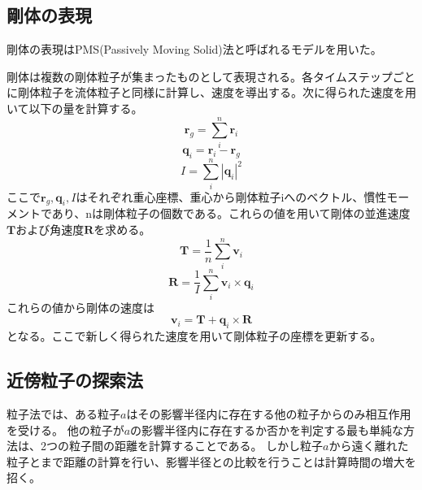 \documentclass[]{jsarticle}
\begin{document}
\subsection{剛体の表現}
剛体の表現はPMS(Passively Moving Solid)法\cite{Gotoh2018}と呼ばれるモデルを用いた。

剛体は複数の剛体粒子が集まったものとして表現される。各タイムステップごとに剛体粒子を流体粒子と同様に計算し、速度を導出する。次に得られた速度を用いて以下の量を計算する。
\begin{equation}
  \bm{r}_g=\sum_{i}^n{\bm{r}_i}
\end{equation}
\begin{equation}
  \bm{q}_i=\bm{r}_i-\bm{r}_g
\end{equation}
\begin{equation}
  I=\sum_{i}^n{|\bm{q}_i|^2}
\end{equation}
ここで$\bm{r}_g,\bm{q}_i,I$はそれぞれ重心座標、重心から剛体粒子iへのベクトル、慣性モーメントであり、nは剛体粒子の個数である。これらの値を用いて剛体の並進速度$\bm{T}$および角速度$\bm{R}$を求める。
\begin{equation}
  \bm{T}=\frac{1}{n}\sum_{i}^n{\bm{v}_i}
\end{equation}
\begin{equation}
  \bm{R}=\frac{1}{I}\sum_{i}^n{\bm{v}_i\times\bm{q}_i}
\end{equation}
これらの値から剛体の速度は
\begin{equation}
\bm{v}_i=\bm{T}+\bm{q}_i\times\bm{R}
\end{equation}
となる。ここで新しく得られた速度を用いて剛体粒子の座標を更新する。

\subsection{近傍粒子の探索法}

粒子法では、ある粒子$a$はその影響半径内に存在する他の粒子からのみ相互作用を受ける。
他の粒子が$a$の影響半径内に存在するか否かを判定する最も単純な方法は、2つの粒子間の距離を計算することである。
しかし粒子$a$から遠く離れた粒子とまで距離の計算を行い、影響半径との比較を行うことは計算時間の増大を招く。
\end{document}
